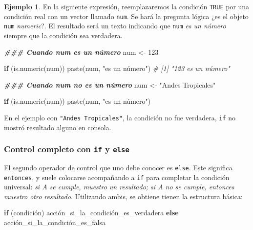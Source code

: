 \documentclass[
]{article}
\newenvironment{Shaded}{\begin{snugshade}}{\end{snugshade}}
\newcommand{\CommentTok}[1]{\textcolor[rgb]{0.56,0.35,0.01}{\textit{#1}}}
\newcommand{\ControlFlowTok}[1]{\textcolor[rgb]{0.13,0.29,0.53}{\textbf{#1}}}
\newcommand{\DecValTok}[1]{\textcolor[rgb]{0.00,0.00,0.81}{#1}}
\newcommand{\DocumentationTok}[1]{\textcolor[rgb]{0.56,0.35,0.01}{\textbf{\textit{#1}}}}
\newcommand{\FunctionTok}[1]{\textcolor[rgb]{0.00,0.00,0.00}{#1}}
\newcommand{\NormalTok}[1]{#1}
\newcommand{\OtherTok}[1]{\textcolor[rgb]{0.56,0.35,0.01}{#1}}
\newcommand{\StringTok}[1]{\textcolor[rgb]{0.31,0.60,0.02}{#1}}
\theoremstyle{definition}
\theoremstyle{definition}
\newtheorem{example}{Ejemplo}[section]
\theoremstyle{definition}
\theoremstyle{definition}
\theoremstyle{remark}
\begin{document}
\begin{example}

En la siguiente expresión, reemplazaremos la condición \texttt{TRUE} por una condición real con un vector llamado \texttt{num}. Se hará la pregunta lógica ¿es el objeto \texttt{num} \emph{numeric}?. El resultado será un texto indicando que \texttt{num} \emph{es un número} siempre que la condición sea verdadera.

\begin{Shaded}
\begin{Highlighting}[]
\DocumentationTok{\#\#\# Cuando num es un número}
\NormalTok{num }\OtherTok{\textless{}{-}} \DecValTok{123}

\ControlFlowTok{if}\NormalTok{ (}\FunctionTok{is.numeric}\NormalTok{(num)) }\FunctionTok{paste}\NormalTok{(num, }\StringTok{"es un número"}\NormalTok{)}
\CommentTok{\# [1] "123 es un número"}

\DocumentationTok{\#\#\# Cuando num no es un número}
\NormalTok{num }\OtherTok{\textless{}{-}} \StringTok{"Andes Tropicales"}

\ControlFlowTok{if}\NormalTok{ (}\FunctionTok{is.numeric}\NormalTok{(num)) }\FunctionTok{paste}\NormalTok{(num, }\StringTok{"es un número"}\NormalTok{)}
\end{Highlighting}
\end{Shaded}

\end{example}

En el ejemplo con \texttt{"Andes\ Tropicales"}, la condición no fue verdadera, \texttt{if} no mostró resultado alguno en consola.

\hypertarget{control-completo-con-if-y-else}{%
\subsubsection{\texorpdfstring{Control completo con \texttt{if} y \texttt{else}}{Control completo con if y else}}\label{control-completo-con-if-y-else}}

El segundo operador de control que uno debe conocer es \texttt{else}. Este significa \texttt{entonces}, y suele colocarse acompañando a \texttt{if} para completar la condición universal: \emph{si A se cumple, muestro un resultado; si A no se cumple, entonces muestro otro resultado}. Utilizando ambis, se obtiene tienen la estructura básica:

\begin{Shaded}
\begin{Highlighting}[]
\ControlFlowTok{if}\NormalTok{ (condición) acción\_si\_la\_condición\_es\_verdadera }\ControlFlowTok{else}\NormalTok{ acción\_si\_la\_condición\_es\_falsa}
\end{Highlighting}
\end{Shaded}
\end{document}
